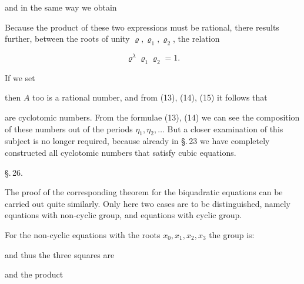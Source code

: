 and in the same way we obtain


Because the product of these two expressions must be rational, there results
further, between the roots of unity $\varrho, \varrho_1, \varrho_2$, the relation

\[
\varrho^\lambda \varrho_1 \varrho_2 = 1.
\]

If we set


then $A$ too is a rational number, and from (13), (14), (15) it follows that


are cyclotomic numbers. %
From the formulae (13), (14) we can see the composition of these numbers out of
the periods $\eta_1, \eta_2, \ldots$ But a closer examination of this
subject is no longer required, because already in \S.\,23 we have completely
constructed all cyclotomic numbers that satisfy cubic equations.

\noindent\hrulefill

\begin{center}
\S.\,26.

\end{center}

The proof of the corresponding theorem for the biquadratic  equations
can be carried out quite similarly. Only here two cases are to be
distinguished, namely equations with non-cyclic group, and
equations with cyclic group.

For the non-cyclic  equations with the roots $x_0, x_1, x_2,
x_3$ the group is:


and thus the three squares are


and the product

